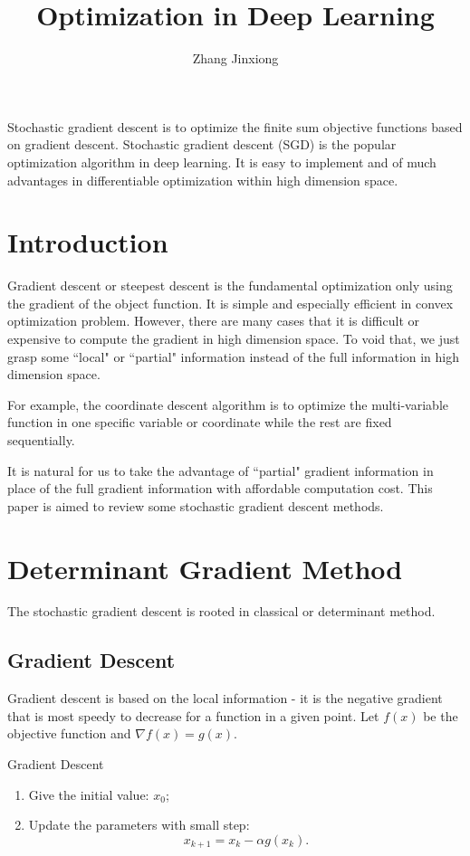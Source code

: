 \documentclass[11pt]{article} %
\title{Optimization in Deep Learning}
\author{Zhang Jinxiong}
\begin{document}
\maketitle

\abstract
Stochastic gradient descent is to optimize the finite sum objective functions based on gradient descent.
Stochastic gradient descent (SGD) is the popular optimization algorithm in deep learning.
It is easy to implement and of much advantages in differentiable optimization within high dimension space.
\section{Introduction}

Gradient descent or steepest descent is the fundamental optimization only using the gradient of the object function.
 It is simple and especially efficient in convex optimization problem.
However, there are many cases that it is difficult or expensive to compute the gradient in high dimension space.
To void that, we just grasp some ``local" or ``partial" information instead of the full information in high dimension space.

For example, the coordinate descent algorithm is to optimize the multi-variable function in one specific variable or coordinate while the rest are fixed sequentially.

It is natural for us to take the advantage of ``partial" gradient information in place of the full gradient information with affordable computation cost.
This paper is aimed to review some stochastic gradient descent methods.

\section{Determinant Gradient Method}
The stochastic gradient descent is rooted in classical or determinant method.

\subsection{Gradient Descent}
Gradient descent is based on the local information -  it is  the negative gradient that is most speedy to decrease for a function in a given point.
Let $f(x)$ be the objective function and $\nabla f(x) = g(x)$.
\begin{algorithm}[htb]
\caption{Gradient Descent}
\label{GD}
\begin{enumerate}
  \item Give the initial value: $x_0$;
  \item Update the parameters with small step: $$x_{k+1}=x_{k} - \alpha g(x_{k}).$$
\end{enumerate}

\end{algorithm}
\end{document}
